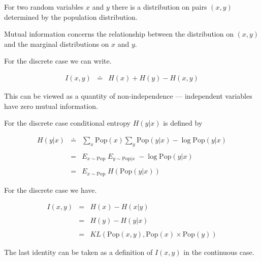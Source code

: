 {For two random variables $x$ and $y$ there is a distribution on pairs $(x,y)$ determined by the population distribution.

\vfill
Mutual information concerns the relationship between the distribution on $(x,y)$ and the marginal distributions on $x$ and $y$.

\vfill
For the discrete case we can write.

\vfill
\begin{eqnarray*}
  I(x,y) & \doteq & H(x) + H(y) - H(x,y)
\end{eqnarray*}

\vfill
This can be viewed as a quantity of non-independence --- independent variables have zero mutual information.


For the discrete case conditional entropy $H(y|x)$ is defined by

\begin{eqnarray*}
  H(y|x) & \doteq & \sum_x \mathrm{Pop}(x) \sum_y \mathrm{Pop}(y|x) - \log \mathrm{Pop}(y|x) \\
  \\
  & = & E_{x\sim \mathrm{Pop}}\;E_{y \sim \mathrm{Pop}|x}\;- \log \mathrm{Pop}(y|x) \\
  \\
  & = & E_{x\sim \mathrm{Pop}}\;H(\mathrm{Pop}(y|x))
\end{eqnarray*}

\vfill
For the discrete case we have.

\vfill
\begin{eqnarray*}
  I(x,y) & = & H(x) - H(x|y) \\
  \\
  & = & H(y) - H(y|x) \\
  \\
  & = & KL(\mathrm{Pop}(x,y),\mathrm{Pop}(x)\times\mathrm{Pop}(y))
\end{eqnarray*}

The last identity can be taken as a definition of $I(x,y)$ in the continuous case.


}

